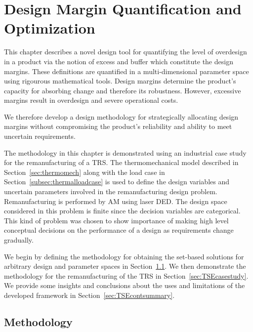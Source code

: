 \chapter{Design Margin Quantification and Optimization}
\label{ch:TSEcont}

This chapter describes a novel design tool for quantifying the level of overdesign in a product via the notion of excess and buffer which constitute the design margins. These definitions are quantified in a multi-dimensional parameter space using rigourous mathematical tools. Design margins determine the product's capacity for absorbing change and therefore its robustness. However, excessive margins result in overdesign and severe operational costs.

We therefore develop a design methodology for strategically allocating design margins without compromising the product's reliability and ability to meet uncertain requirements.

The methodology in this chapter is demonstrated using an industrial case study for the remanufacturing of a \ac{TRS}. The thermomechanical model described in Section~\ref{sec:thermomech} along with the load case in Section~\ref{subsec:thermalloadcase} is used to define the design variables and uncertain parameters involved in the remanufacturing design problem. Remanufacturing is performed by \ac{AM} using laser \ac{DED}. The design space considered in this problem is finite since the decision variables are categorical. This kind of problem was chosen to show importance of making high level conceptual decisions on the performance of a design as requirements change gradually.

We begin by defining the methodology for obtaining the set-based solutions for arbitrary design and parameter spaces in Section~\ref{sec:TSEmethods}. We then demonstrate the methodology for the remanufacturing of the \ac{TRS} in Section~\ref{sec:TSEcasestudy}. We provide some insights and conclusions about the uses and limitations of the developed framework in Section~\ref{sec:TSEcontsummary}.

\section{Methodology} \label{sec:TSEmethods}

